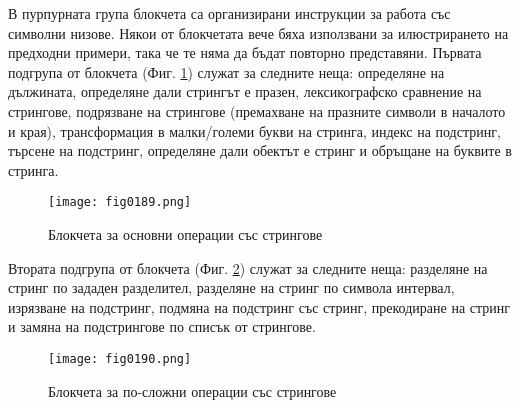 В пурпурната група блокчета са организирани инструкции за работа със символни низове. Някои от блокчетата вече бяха използвани за илюстрирането на предходни примери, така че те няма да бъдат повторно представяни. Първата подгрупа от блокчета (Фиг. \ref{fig0189}) служат за следните неща: определяне на дължината, определяне дали стрингът е празен, лексикографско сравнение на стрингове, подрязване на стрингове (премахване на празните символи в началото и края), трансформация в малки/големи букви на стринга, индекс на подстринг, търсене на подстринг, определяне дали обектът е стринг и обръщане на буквите в стринга.

\begin{figure}[H]
  \centering
  \texttt{[image: fig0189.png]}
  \caption{Блокчета за основни операции със стрингове}
\label{fig0189}
\end{figure}

Втората подгрупа от блокчета (Фиг. \ref{fig0190}) служат за следните неща: разделяне на стринг по зададен разделител, разделяне на стринг по символа интервал, изрязване на подстринг, подмяна на подстринг със стринг, прекодиране на стринг и замяна на подстрингове по списък от стрингове.

\begin{figure}[H]
  \centering
  \texttt{[image: fig0190.png]}
  \caption{Блокчета за по-сложни операции със стрингове}
\label{fig0190}
\end{figure}

